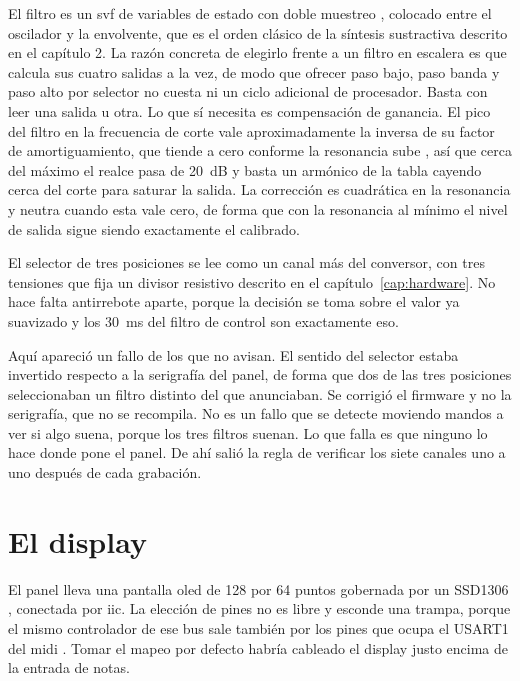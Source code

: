 El filtro es un \gls{svf} de variables de estado con doble muestreo
\cite{DaisySP}, colocado entre el oscilador y la envolvente, que es el orden
clásico de la síntesis sustractiva descrito en el capítulo 2. La razón concreta de
elegirlo frente a un filtro en escalera es que calcula sus cuatro salidas a la
vez, de modo que ofrecer paso bajo, paso banda y paso alto por selector no
cuesta ni un ciclo adicional de procesador. Basta con leer una salida u otra.
Lo que sí necesita es compensación de ganancia. El pico del filtro en la
frecuencia de corte vale aproximadamente la inversa de su factor de
amortiguamiento, que tiende a cero conforme la resonancia sube \cite{DaisySP},
así que cerca del máximo el realce pasa de 20~dB y basta un armónico de la tabla
cayendo cerca del corte para saturar la salida. La corrección es cuadrática en
la resonancia y neutra cuando esta vale cero, de forma que con la resonancia al
mínimo el nivel de salida sigue siendo exactamente el calibrado.

El selector de tres posiciones se lee como un canal más del conversor, con tres
tensiones que fija un divisor resistivo descrito en el
capítulo~\ref{cap:hardware}. No hace falta antirrebote aparte, porque la
decisión se toma sobre el valor ya suavizado y los 30~ms del filtro de control
son exactamente eso.

Aquí apareció un fallo de los que no avisan. El sentido del selector estaba
invertido respecto a la serigrafía del panel, de forma que dos de las tres
posiciones seleccionaban un filtro distinto del que anunciaban. Se corrigió el
firmware y no la serigrafía, que no se recompila. No es un fallo que se detecte
moviendo mandos a ver si algo suena, porque los tres filtros suenan. Lo que
falla es que ninguno lo hace donde pone el panel. De ahí salió la regla de
verificar los siete canales uno a uno después de cada grabación.

\section{El display}
\label{sec:oled}

El panel lleva una pantalla \gls{oled} de 128 por 64 puntos gobernada por un
SSD1306 \cite{SSD1306}, conectada por \gls{iic}. La elección de pines no es
libre y esconde una trampa, porque el mismo controlador de ese bus sale también
por los pines que ocupa el USART1 del \gls{midi} \cite{DaisySeed}. Tomar el
mapeo por defecto habría cableado el display justo encima de la entrada de
notas.

